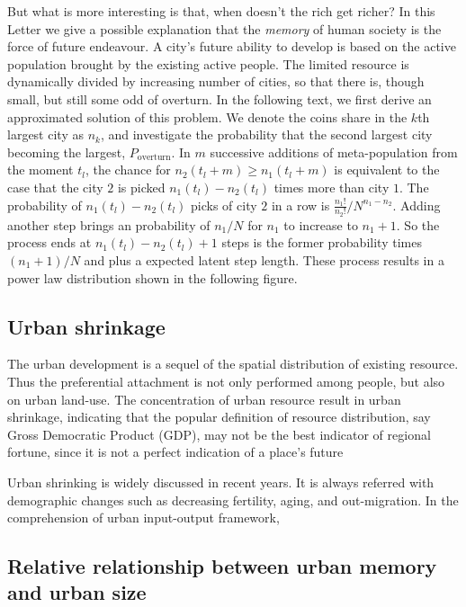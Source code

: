\documentclass[aps,prl]{revtex4-1}
\begin{document}
But what is more interesting is that, when doesn't the rich get richer? In this Letter we give a possible explanation that the \emph{memory} of human society is the force of future endeavour. A city's future ability to develop is based on the active population brought by the existing active people. The limited resource is dynamically divided by increasing number of cities, so that there is, though small, but still some odd of overturn. In the following text, we first derive an approximated solution of this problem. We denote the coins share in the $k$th largest city as $n_k$, and investigate the probability that the second largest city becoming the largest, $P_{\text{overturn}}$. In $m$ successive additions of meta-population from the moment $t_l$, the chance for $n_2(t_l+m)\ge n_1(t_l+m)$ is equivalent to the case that the city $2$ is picked $n_1(t_l)-n_2(t_l)$ times more than city $1$. The probability of $n_1(t_l)-n_2(t_l)$ picks of city $2$ in a row is $\frac{n_1!}{n_2!}/N^{n_1-n_2}$. Adding another step brings an probability of $n_1/N$ for $n_1$ to increase to $n_1+1$. So the process ends at $n_1(t_l)-n_2(t_l)+1$ steps is the former probability times $(n_1+1)/N$ and plus a expected latent step length. These process results in a power law distribution shown in the following figure.



\subsection{Urban shrinkage}

The urban development is a sequel of the spatial distribution of existing resource. Thus the preferential attachment is not only performed among people, but also on urban land-use. The concentration of urban resource result in urban shrinkage, indicating that the popular definition of resource distribution, say Gross Democratic Product (GDP), may not be the best indicator of regional fortune, since it is not a perfect indication of a place's future 

Urban shrinking is widely discussed in recent years. It is always referred with demographic changes such as decreasing fertility, aging, and out-migration\cite{haase2008urban}. In the comprehension of urban input-output framework, 

\subsection{Relative relationship between urban memory and urban size}
\end{document}
